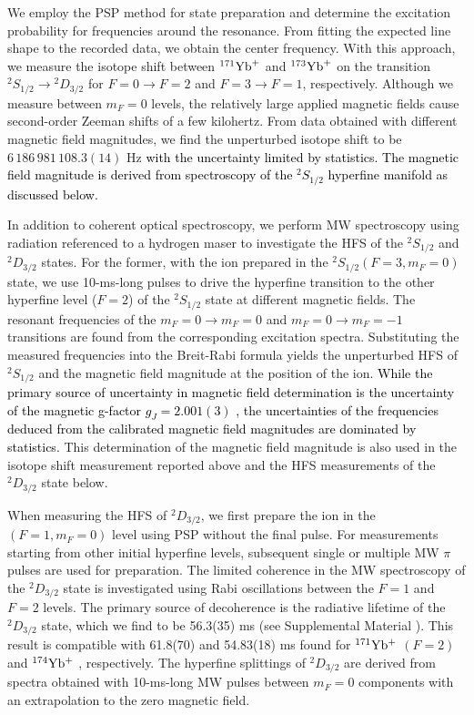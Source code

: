 \documentclass[
reprint,
superscriptaddress,









amsmath,amssymb,
aps,prl






]{revtex4-2}
\newcommand{\m}[1]{\textcolor{black}{#1}}
\begin{document}
We employ the PSP method for state preparation and determine the excitation probability for frequencies around the resonance. From fitting the expected line shape to the recorded data, we obtain the center frequency.
With this approach, we measure the isotope shift between $^{171}\rm{Yb}^+$ and $^{173}\rm{Yb}^+$ on the transition $^2\!{S}_{1/2} \rightarrow {}^2\!D_{3/2}$ for $F=0 \rightarrow F=2$ and $F=3 \rightarrow F=1$, respectively.
Although we measure between $m_F=0$ levels, the relatively large applied magnetic fields cause second-order Zeeman shifts of a few kilohertz. From data obtained with different magnetic field magnitudes, we find the unperturbed isotope shift to be $6\,186\,981\,108.3(14)$ Hz \m{ with the uncertainty limited by statistics. The magnetic field magnitude is derived from spectroscopy of the $^2\!S_{1/2}$ hyperfine manifold as discussed below.}

In addition to coherent optical spectroscopy, we perform MW spectroscopy using radiation referenced to a hydrogen maser to investigate the HFS of the $^2\!S_{1/2}$ and ${}^2\!D_{3/2}$ states.
For the former, with the ion prepared in the $^2\!S_{1/2}(F=3,m_F=0)$ state, we use 10-ms-long pulses to drive the hyperfine transition to the other hyperfine level ($F=2$) of the $^2\!S_{1/2}$ state at different magnetic fields.
The resonant frequencies of the $m_F=0 \rightarrow m_F=0$ and $m_F=0 \rightarrow m_F=-1$ transitions are found from the corresponding excitation spectra.
Substituting the measured frequencies into the Breit-Rabi formula \cite{Breit1931} yields the unperturbed HFS of $^2\!S_{1/2}$ and the magnetic field magnitude at the position of the ion. \m{While the primary source of uncertainty in magnetic field determination is the uncertainty of the magnetic g-factor $g_J=2.001(3)$ \cite{FAWCETT1991, Gossel2013}, the uncertainties of the frequencies deduced from the calibrated magnetic field magnitudes are dominated by statistics.}
This determination of the magnetic field magnitude is also used in the isotope shift measurement reported above and the HFS measurements of the ${}^2\!D_{3/2}$ state below.

When measuring the HFS of ${}^2\!D_{3/2}$, we first prepare the ion in the $(F=1,m_F=0)$ level using PSP without the final pulse.
For measurements starting from other initial hyperfine levels, subsequent single or multiple MW $\pi$ pulses are used for preparation.
The limited coherence in the MW spectroscopy of the ${}^2\!D_{3/2}$ state is investigated using Rabi oscillations between the $F=1$ and $F=2$ levels.
The primary source of decoherence is the radiative lifetime of the ${}^2\!D_{3/2}$ state, which we find to be 56.3(35) ms (see Supplemental Material \cite{appendixA}). This result is compatible with 61.8(70) and 54.83(18) ms found for $\rm^{171}Yb^+$ $(F=2)$ \cite{Schacht2015} and $\rm^{174}Yb^+$ \cite{Shao2023}, respectively.
The hyperfine splittings of ${}^2\!D_{3/2}$ are derived from spectra obtained with 10-ms-long MW pulses between $m_F=0$ components with an extrapolation to the zero magnetic field.
\end{document}
